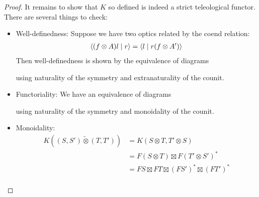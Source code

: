 \documentclass[11pt,letterpaper]{article}
\theoremstyle{plain}
\theoremstyle{definition}
\newcommand{\switched}{\mathbin{\tilde{\otimes}}}
\newcommand{\teletimes}{\mathbin{\boxtimes}}
\newcommand{\rep}[2]{{\ensuremath \left\langle #1 \mid #2 \right\rangle}}
\begin{document}
\begin{proof}
It remains to show that $K$ so defined is indeed a strict teleological functor. There are several things to check:
\begin{itemize}
\item Well-definedness: Suppose we have two optics related by the coend relation:
  \begin{align*}
    \rep{(f \otimes A) l}{r} = \rep{l}{r (f \otimes A')}
  \end{align*}
  Then well-definedness is shown by the equivalence of diagrams
  \begin{center}
    
    \qquad \raisebox{1.5cm}{$=$} \qquad
    
  \end{center}
  using naturality of the symmetry and extranaturality of the counit.
\item Functoriality: We have an equivalence of diagrams
  \begin{center}
    
    \quad \raisebox{1.5cm}{$=$} \quad
    
  \end{center}
using naturality of the symmetry and monoidality of the counit.
\item Monoidality:
\begin{align*}
K((S, S') \switched (T, T'))
&= K(S \otimes T, T' \otimes S) \\
&= F(S \otimes T) \teletimes {F(T' \otimes S')}^* \\
&= FS \teletimes FT \teletimes {(FS')}^* \teletimes {(FT')}^* \\

\end{align*}
\end{itemize}
\end{proof}
\end{document}
